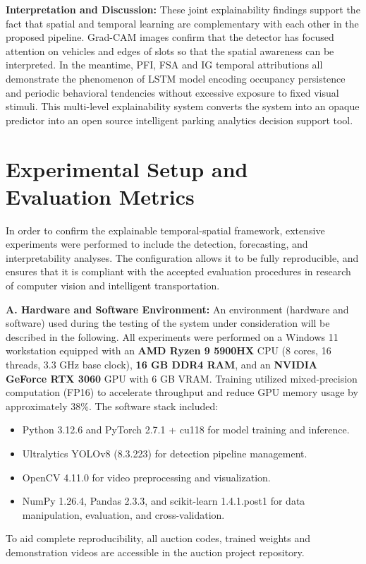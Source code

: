 \documentclass[conference]{IEEEtran}
\begin{document}
\vspace{0.3em}
\noindent\textbf{Interpretation and Discussion:}
These joint explainability findings support the fact that spatial and temporal learning are complementary with each other in the proposed pipeline. Grad-CAM images confirm that the detector has focused attention on vehicles and edges of slots so that the spatial awareness can be interpreted. In the meantime, PFI, FSA and IG temporal attributions all demonstrate the phenomenon of LSTM model encoding occupancy persistence and periodic behavioral tendencies without excessive exposure to fixed visual stimuli. This multi-level explainability system converts the system into an opaque predictor into an open source intelligent parking analytics decision support tool.

\section{Experimental Setup and Evaluation Metrics}
In order to confirm the explainable temporal-spatial framework, extensive experiments were performed to include the detection, forecasting, and interpretability analyses. The configuration allows it to be fully reproducible, and ensures that it is compliant with the accepted evaluation procedures in research of computer vision and intelligent transportation.

\vspace{0.4em}
\noindent\textbf{A. Hardware and Software Environment:}
An environment (hardware and software) used during the testing of the system under consideration will be described in the following.
All experiments were performed on a Windows 11 workstation equipped with an \textbf{AMD Ryzen 9 5900HX} CPU (8 cores, 16 threads, 3.3 GHz base clock), \textbf{16 GB DDR4 RAM}, and an \textbf{NVIDIA GeForce RTX 3060} GPU with 6 GB VRAM. Training utilized mixed-precision computation (FP16) to accelerate throughput and reduce GPU memory usage by approximately 38\%.   
The software stack included:
\begin{itemize}
    \item Python 3.12.6 and PyTorch 2.7.1 + cu118 for model training and inference.
    \item Ultralytics YOLOv8 (8.3.223) for detection pipeline management.
    \item OpenCV 4.11.0 for video preprocessing and visualization.
    \item NumPy 1.26.4, Pandas 2.3.3, and scikit-learn 1.4.1.post1 for data manipulation, evaluation, and cross-validation.
\end{itemize}
To aid complete reproducibility, all auction codes, trained weights and demonstration videos are accessible in the auction project repository.
\end{document}
